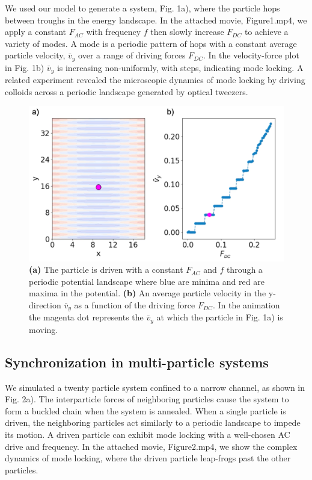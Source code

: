 \documentclass[prb,preprint]{revtex4}
\begin{document}
We used our model to generate a system, Fig. 1a), where the particle hops between troughs in the energy landscape. In the attached movie, Figure1.mp4, we apply a constant $F_{AC}$ with frequency $f$ then slowly increase $F_{DC}$  to achieve a variety of modes. A mode is a periodic pattern of hops with a constant average particle velocity, $\bar{v}_{y}$ over a range of driving forces $F_{DC}$. In the velocity-force plot in Fig. 1b) $\bar{v}_{y}$ is increasing non-uniformly, with steps, indicating mode locking. A related experiment \cite{juniper2015} revealed the microscopic dynamics of mode locking by driving colloids across a periodic landscape generated by optical tweezers.

\begin{center}
\begin{figure}[h!]
\centering
\includegraphics[scale=.25]{single}
\caption{\textbf{(a)} The particle is driven with a constant $F_{AC}$ and $f$ through a periodic potential landscape where blue are minima and red are maxima in the potential. \textbf{(b)} An average particle velocity in the y-direction $\bar{v}_{y}$ as a function of the driving force $F_{DC}$. In the animation the magenta dot represents the $\bar{v}_{y}$ at which the particle in Fig. 1a) is moving.}
\end{figure}
\end{center}

\subsection{Synchronization in multi-particle systems}
\label{sec:sync}

We simulated a twenty particle system confined to a narrow channel, as shown in Fig. 2a). The interparticle forces of neighboring particles cause the system to form a buckled chain when the system is annealed. When a single particle is driven, the neighboring particles act similarly to a periodic landscape to impede its motion. A driven particle can exhibit mode locking with a well-chosen AC drive and frequency. In the attached movie, Figure2.mp4, we show the complex dynamics of mode locking, where the driven particle leap-frogs past the other particles. 
\end{document}
